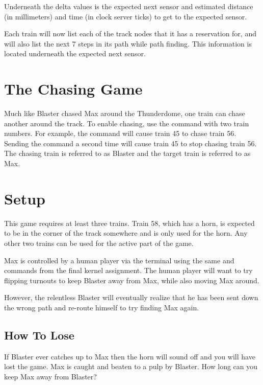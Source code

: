 \documentclass[pdftex,10pt,a4paper]{article}
\begin{document}
Underneath the delta values is the expected next sensor and estimated
distance (in millimeters) and time (in clock server ticks) to get to
the expected sensor.

Each train will now list each of the track nodes that it has a
reservation for, and will also list the next 7 steps in its path while
path finding. This information is located underneath the expected next
sensor.

\section*{The Chasing Game}

Much like Blaster chased Max around the Thunderdome, one train can
chase another around the track. To enable chasing, use the
 command with two train numbers. For
example, the command  will cause train 45 to chase train
56. Sending the command a second time will cause train 45 to stop
chasing train 56. The chasing train is referred to as Blaster and the
target train is referred to as Max.

\section*{Setup}

This game requires at least three trains. Train 58, which has a horn,
is expected to be in the corner of the track somewhere and is only
used for the horn. Any other two trains can be used for the active
part of the game.

Max is controlled by a human player via the terminal using the same
 and  commands from
the final kernel assignment. The human player will want to try
flipping turnouts to keep Blaster away from Max, while also moving Max
around.

However, the relentless Blaster will eventually realize that he has
been sent down the wrong path and re-route himself to try finding Max
again.

\subsection*{How To Lose}

If Blaster ever catches up to Max then the horn will sound off and you
will have lost the game. Max is caught and beaten to a pulp by
Blaster. How long can you keep Max away from Blaster?
\end{document}
